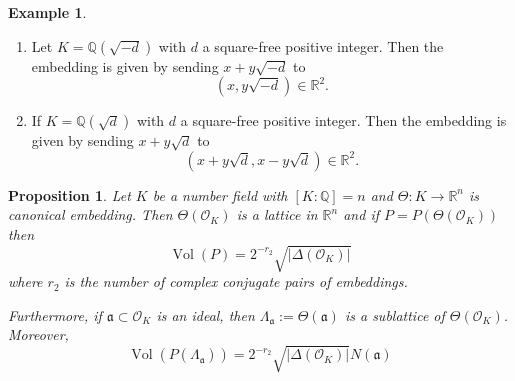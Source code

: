 \documentclass[11pt,a4paper]{report}
\theoremstyle{plain}
\newtheorem{prop}[subsection]{Proposition}
\theoremstyle{definition}
\newtheorem{exmp}[subsection]{Example}
\theoremstyle{definition}
\newcommand{\RR}{\mathbb{R}}
\def\QQ{\mathbb{Q}}
\def \OO {\mathcal{O}}
\def\gotha{\mathfrak{a}}
\DeclareMathOperator{\Vol}{Vol}
\begin{document}
\begin{exmp}
	\begin{enumerate}
		\item 	Let $K=\QQ(\sqrt{-d})$ with $d$ a square-free positive integer. Then the embedding is given by sending $x+y\sqrt{-d}$ to \[(x,y\sqrt{-d}) \in \RR^2. \]
		\item If $K=\QQ(\sqrt{d})$ with $d$ a square-free positive integer. Then the embedding is given by sending $x+y\sqrt{d}$ to \[(x+y\sqrt{d},x-y\sqrt{d}) \in \RR^2. \]
	\end{enumerate}
	
\end{exmp}

\begin{prop}Let $K$ be a number field with $[K:\QQ]=n$ and $\Theta: K \to \RR^n$ is canonical embedding. Then $\Theta(\OO_K)$ is a lattice in $\RR^n$ and if $P=P(\Theta(\OO_K))$ then \[\Vol(P)=2^{-r_2}\sqrt{|\Delta(\OO_K)|}\] where $r_2$ is the number of complex conjugate pairs of embeddings.
	
	Furthermore, if $\gotha \subset \OO_K$ is an ideal, then $\Lambda_\gotha:=\Theta(\gotha)$ is a sublattice of $\Theta(\OO_K)$. 	Moreover, \[\Vol(P(\Lambda_\gotha))=2^{-r_2}\sqrt{|\Delta(\OO_K)|}N(\gotha)\]
	
\end{prop}
\end{document}
